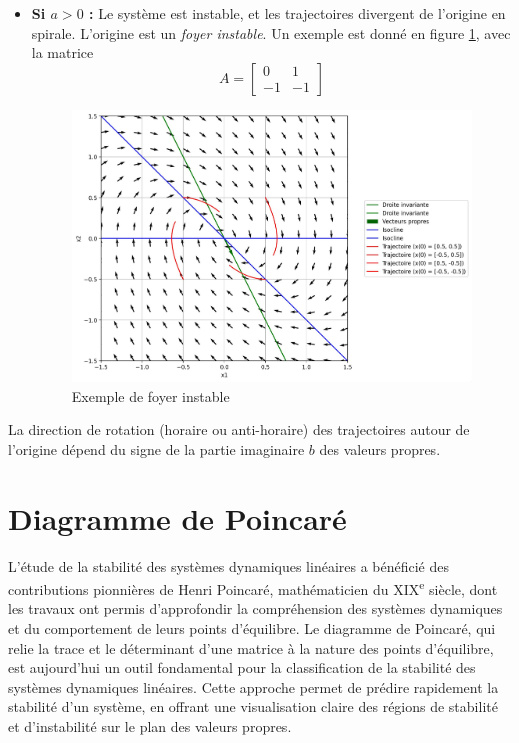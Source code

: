 \begin{itemize}
                \item \textbf{Si $a > 0$ :} Le système est instable, et les trajectoires divergent de l'origine en spirale. L'origine est un \textit{foyer instable}. Un exemple est donné en figure \ref{fig:foyer_instable}, avec la matrice
                \begin{equation}
                    A = \begin{bmatrix} 0 & 1 \\ -1 & -1 \end{bmatrix}
                \end{equation}
                \begin{figure}[ht!]
                    \centering
                    \includegraphics[width=\textwidth]{images/foyer_instable.jpg}
                    \caption{Exemple de foyer instable}
                    \label{fig:foyer_instable}
                \end{figure}
            \end{itemize}
            
            La direction de rotation (horaire ou anti-horaire) des trajectoires autour de l'origine dépend du signe de la partie imaginaire $b$ des valeurs propres.
            
    \section{Diagramme de Poincaré}\label{sec:poincare}
        L'étude de la stabilité des systèmes dynamiques linéaires a bénéficié des contributions pionnières de Henri Poincaré, mathématicien du XIX\textsuperscript{e} siècle, dont les travaux ont permis d'approfondir la compréhension des systèmes dynamiques et du comportement de leurs points d'équilibre. Le diagramme de Poincaré, qui relie la trace et le déterminant d'une matrice à la nature des points d'équilibre, est aujourd'hui un outil fondamental pour la classification de la stabilité des systèmes dynamiques linéaires. Cette approche permet de prédire rapidement la stabilité d'un système, en offrant une visualisation claire des régions de stabilité et d'instabilité sur le plan des valeurs propres.
        
